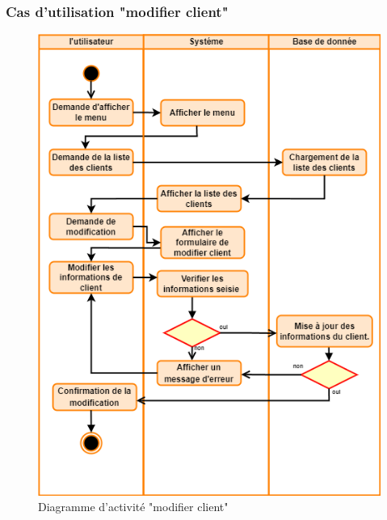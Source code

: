 \documentclass[edit,12pt,a4paper,ChapStyle,oneside,doubleinterligne]{report}
\begin{document}
\clearpage
\subsubsection{Cas d'utilisation "modifier client"}
\begin{figure}[h!]\label{fig:activite modiciferc}
    \centering
    \includegraphics[width=1\textwidth]{images/act modifier client.png}
    \caption{Diagramme d'activité "modifier client"}
\end{figure}

\clearpage
\end{document}

